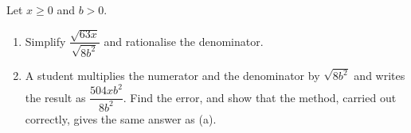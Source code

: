 Let $x\ge0$ and $b>0$.
\begin{enumerate}
\item[(a)] Simplify $\dfrac{\sqrt{63x}}{\sqrt{8b^2}}$ and rationalise the denominator.
\item[(b)] A student multiplies the numerator and the denominator by $\sqrt{8b^2}$ and writes the result as $\dfrac{504xb^2}{8b^2}$. Find the error, and show that the method, carried out correctly, gives the same answer as (a).
\end{enumerate}
